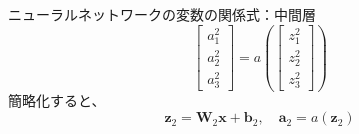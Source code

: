 \documentclass[dvipdfmx,aspectratio=169]{beamer}
\begin{document}
\begin{frame}[allowframebreaks]{ニューラルネットワークの変数の関係式：中間層}
		\begin{equation*}
			\begin{bmatrix}
				a^2_1\\ a^2_2\\ a^2_3
			\end{bmatrix} = a\left(\begin{bmatrix}
				z^2_1\\ z^2_2\\ z^2_3
			\end{bmatrix}\right)
		\end{equation*}
		簡略化すると、
		\begin{equation*}
			\boldsymbol{z}_2 = \mathbf{W}_2\boldsymbol{x} + \boldsymbol{b}_2,\quad \boldsymbol{a}_2 = a(\boldsymbol{z}_2)
		\end{equation*}
		
\end{frame}
\end{document}
